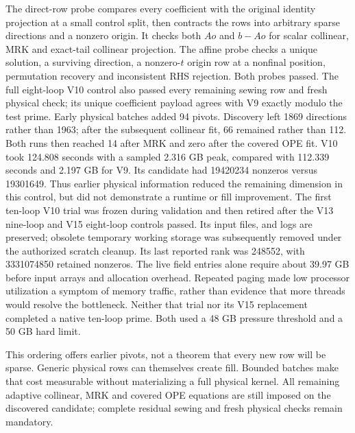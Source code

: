 \documentclass[11pt]{article}
\begin{document}
The direct-row probe compares every coefficient with the original identity
projection at a small control split, then contracts the rows into arbitrary
sparse directions and a nonzero origin. It checks both $Ao$ and $b-Ao$ for
scalar collinear, MRK and exact-tail collinear projection. The affine probe
checks a unique solution, a surviving direction, a nonzero-$t$ origin row
at a nonfinal position, permutation recovery and inconsistent RHS rejection.
Both probes passed. The full eight-loop V10 control also passed every
remaining sewing row and fresh physical check; its unique coefficient
payload agrees with V9 exactly modulo the test prime. Early physical
batches added 94 pivots. Discovery left 1869 directions rather than 1963;
after the subsequent collinear fit, 66 remained rather than 112. Both runs
then reached 14 after MRK and zero after the covered OPE fit. V10 took
124.808 seconds with a sampled 2.316 GB peak, compared with 112.339 seconds
and 2.197 GB for V9. Its candidate had 19420234 nonzeros versus 19301649.
Thus earlier physical information reduced the remaining dimension in this
control, but did not demonstrate a runtime or fill improvement.
The first ten-loop V10 trial was frozen during validation and then retired
after the V13 nine-loop and V15 eight-loop controls passed. Its input files,
and logs are preserved; obsolete temporary working storage was subsequently
removed under the authorized scratch cleanup. Its last reported rank was 248552, with
3331074850 retained nonzeros. The live field entries alone require about
39.97 GB before input arrays and allocation overhead. Repeated paging made
low processor utilization a symptom of memory traffic, rather than evidence
that more threads would resolve the bottleneck. Neither that trial nor its
V15 replacement completed a native ten-loop prime. Both used a 48 GB
pressure threshold and a 50 GB hard limit.

This ordering offers earlier pivots, not a theorem that every new row will
be sparse. Generic physical rows can themselves create fill. Bounded batches
make that cost measurable without materializing a full physical kernel.
All remaining adaptive collinear, MRK and covered OPE equations are still
imposed on the discovered candidate; complete residual sewing and fresh
physical checks remain mandatory.
\end{document}
